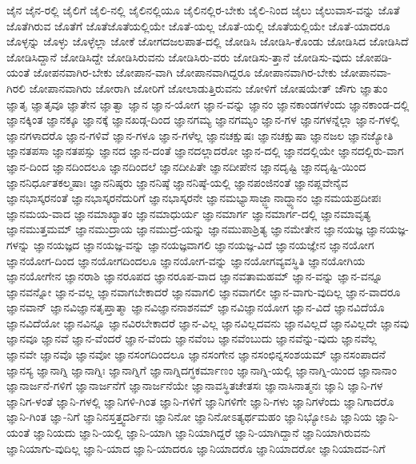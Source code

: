 {ಜೈನ
ಜೈನ-ರಲ್ಲಿ
ಜೈಲಿಗೆ
ಜೈಲಿ-ನಲ್ಲಿ
ಜೈಲಿನಲ್ಲಿಯೂ
ಜೈಲಿನಲ್ಲಿರ-ಬೇಕು
ಜೈಲಿ-ನಿಂದ
ಜೈಲು
ಜೈಲುವಾಸ-ವನ್ನು
ಜೊತೆ
ಜೊತೆಗಿರುವ
ಜೊತೆಗೆ
ಜೊತೆಜೊತೆಯಲ್ಲಿಯೇ
ಜೊತೆ-ಯಲ್ಲ
ಜೊತೆ-ಯಲ್ಲಿ
ಜೊತೆಯಲ್ಲಿಯೇ
ಜೊತೆ-ಯಾದರೂ
ಜೊಳ್ಳನ್ನು
ಜೊಳ್ಳು
ಜೊಳ್ಳೆಲ್ಲಾ
ಜೋಕೆ
ಜೋಗದಜಲಪಾತ-ದಲ್ಲಿ
ಜೋಡಿಸಿ
ಜೋಡಿಸಿ-ಕೊಂಡು
ಜೋಡಿಸಿದ
ಜೋಡಿಸಿದೆ
ಜೋಡಿಸಿದ್ದಾನೆ
ಜೋಡಿಸಿದ್ದೇ
ಜೋಡಿಸಿರುವನು
ಜೋಡಿಸಿರು-ವರು
ಜೋಡಿಸು-ತ್ತಾನೆ
ಜೋಡಿಸು-ವುದು
ಜೋಪಡಿ-ಯಂತೆ
ಜೋಪನವಾಗಿರ-ಬೇಕು
ಜೋಪಾನ-ವಾಗಿ
ಜೋಪಾನವಾಗಿದ್ದರೂ
ಜೋಪಾನವಾಗಿರ-ಬೇಕು
ಜೋಪಾನವಾ-ಗಿರಲಿ
ಜೋಪಾನವಾಗಿರು
ಜೋರಾಗಿ
ಜೋರಿಗೆ
ಜೋಲಾಡುತ್ತಿರುವನು
ಜೋಳಿಗೆ
ಜೋಷಯೇತ್
ಜೌಗು
ಜ್ಞಾತುಂ
ಜ್ಞಾತೃ
ಜ್ಞಾತೃವೂ
ಜ್ಞಾತೇನ
ಜ್ಞಾತ್ವಾ
ಜ್ಞಾನ
ಜ್ಞಾನ-ಯೋಗ
ಜ್ಞಾನ-ವನ್ನು
ಜ್ಞಾನಂ
ಜ್ಞಾನಕಾಂಡಗಳೆಂದು
ಜ್ಞಾನಕಾಂಡ-ದಲ್ಲಿ
ಜ್ಞಾನಕ್ಕಿಂತ
ಜ್ಞಾನಕ್ಕೂ
ಜ್ಞಾನಕ್ಕೆ
ಜ್ಞಾನಖಡ್ಗ-ದಿಂದ
ಜ್ಞಾನಗಮ್ಯ
ಜ್ಞಾನಗಮ್ಯಂ
ಜ್ಞಾನ-ಗಳ
ಜ್ಞಾನಗಳನ್ನೆಲ್ಲಾ
ಜ್ಞಾನ-ಗಳಲ್ಲಿ
ಜ್ಞಾನಗಳಾದರೊ
ಜ್ಞಾನ-ಗಳಿವೆ
ಜ್ಞಾನ-ಗಳೂ
ಜ್ಞಾನ-ಗಳೆಲ್ಲ
ಜ್ಞಾನಚಕ್ಷುಷಃ
ಜ್ಞಾನಚಕ್ಷುಷಾ
ಜ್ಞಾನಜಲ
ಜ್ಞಾನಜ್ಯೋತಿ
ಜ್ಞಾನತಪಸಾ
ಜ್ಞಾನತಪಸ್ಸು
ಜ್ಞಾನದ
ಜ್ಞಾನ-ದಂತೆ
ಜ್ಞಾನದಲ್ಲಾದರೋ
ಜ್ಞಾನ-ದಲ್ಲಿ
ಜ್ಞಾನದಲ್ಲಿಯೇ
ಜ್ಞಾನದಲ್ಲಿರು-ವಾಗ
ಜ್ಞಾನ-ದಿಂದ
ಜ್ಞಾನದಿಂದಲೂ
ಜ್ಞಾನದಿಂದಲೆ
ಜ್ಞಾನದೀಪಿತೇ
ಜ್ಞಾನದೀಪೇನ
ಜ್ಞಾನದೃಷ್ಟಿ
ಜ್ಞಾನದೃಷ್ಟಿ-ಯಿಂದ
ಜ್ಞಾನನಿರ್ಧೂತಕಲ್ಮಷಾಃ
ಜ್ಞಾನನಿಷ್ಠರು
ಜ್ಞಾನನಿಷ್ಠೆ
ಜ್ಞಾನನಿಷ್ಠೆ-ಯಲ್ಲಿ
ಜ್ಞಾನಪಂಜಿನಂತೆ
ಜ್ಞಾನಪ್ಲವೇನೈವ
ಜ್ಞಾನಭಾಸ್ಕರನಂತೆ
ಜ್ಞಾನಭಾಸ್ಕರನೆದುರಿಗೆ
ಜ್ಞಾನಭಾಸ್ಕರನೇ
ಜ್ಞಾನಮಭ್ಯಾಸಾಜ್ಜ್ಞಾನಾದ್ಧ್ಯಾನಂ
ಜ್ಞಾನಮಯಪ್ರದೀಪಃ
ಜ್ಞಾನಮಯ-ವಾದ
ಜ್ಞಾನಮಾಖ್ಯಾತಂ
ಜ್ಞಾನಮಾಧುರ್ಯ
ಜ್ಞಾನಮಾರ್ಗ
ಜ್ಞಾನಮಾರ್ಗ-ದಲ್ಲಿ
ಜ್ಞಾನಮಾವೃತ್ಯ
ಜ್ಞಾನಮುತ್ತಮಮ್
ಜ್ಞಾನಮುದ್ರಾಯ
ಜ್ಞಾನಮುದ್ರೆ-ಯನ್ನು
ಜ್ಞಾನಮುಪಾಶ್ರಿತ್ಯ
ಜ್ಞಾನಮೇತೇನ
ಜ್ಞಾನಯಜ್ಞ
ಜ್ಞಾನಯಜ್ಞ-ಗಳನ್ನು
ಜ್ಞಾನಯಜ್ಞದ
ಜ್ಞಾನಯಜ್ಞ-ವನ್ನು
ಜ್ಞಾನಯಜ್ಞವಾಗಲಿ
ಜ್ಞಾನಯಜ್ಞ-ವಿದೆ
ಜ್ಞಾನಯಜ್ಞೇನ
ಜ್ಞಾನಯೋಗ
ಜ್ಞಾನಯೋಗ-ದಿಂದ
ಜ್ಞಾನಯೋಗದಿಂದಲೂ
ಜ್ಞಾನಯೋಗ-ವನ್ನು
ಜ್ಞಾನಯೋಗವ್ಯವಸ್ಥಿತಿ
ಜ್ಞಾನಯೋಗಿಯ
ಜ್ಞಾನಯೋಗೇನ
ಜ್ಞಾನರಾಶಿ
ಜ್ಞಾನರೂಪದ
ಜ್ಞಾನರೂಪ-ವಾದ
ಜ್ಞಾನವತಾಮಹಮ್
ಜ್ಞಾನ-ವನ್ನು
ಜ್ಞಾನ-ವನ್ನೂ
ಜ್ಞಾನವನ್ನೋ
ಜ್ಞಾನ-ವಲ್ಲ
ಜ್ಞಾನವಾಗಬೇಕಾದರೆ
ಜ್ಞಾನವಾಗಲಿ
ಜ್ಞಾನವಾಗಲೀ
ಜ್ಞಾನ-ವಾಗು-ವುದಿಲ್ಲ
ಜ್ಞಾನ-ವಾದರೂ
ಜ್ಞಾನವಾನ್
ಜ್ಞಾನವಿಜ್ಞಾನತೃಪ್ತಾತ್ಮಾ
ಜ್ಞಾನವಿಜ್ಞಾನನಾಶನಮ್
ಜ್ಞಾನವಿಜ್ಞಾನಯೋಗ
ಜ್ಞಾನ-ವಿದೆ
ಜ್ಞಾನವಿದೆಯೊ
ಜ್ಞಾನವಿದೆಯೋ
ಜ್ಞಾನವಿನ್ನೂ
ಜ್ಞಾನವಿರಬೇಕಾದರೆ
ಜ್ಞಾನ-ವಿಲ್ಲ
ಜ್ಞಾನವಿಲ್ಲದವನು
ಜ್ಞಾನವಿಲ್ಲದೆ
ಜ್ಞಾನವಿಲ್ಲದೇ
ಜ್ಞಾನವು
ಜ್ಞಾನವೂ
ಜ್ಞಾನವೆ
ಜ್ಞಾನ-ವೆಂದರೆ
ಜ್ಞಾನ-ವೆಂದು
ಜ್ಞಾನವೆಂಬ
ಜ್ಞಾನವೆಂಬುದು
ಜ್ಞಾನವೆನ್ನು-ವುದು
ಜ್ಞಾನವೆಲ್ಲ
ಜ್ಞಾನವೇ
ಜ್ಞಾನವೊ
ಜ್ಞಾನವೋ
ಜ್ಞಾನಸಂಗದಿಂದಲೂ
ಜ್ಞಾನಸಂಗೇನ
ಜ್ಞಾನಸಂಛಿನ್ನಸಂಶಯಮ್
ಜ್ಞಾನಸಂಪಾದನೆ
ಜ್ಞಾನಸ್ಯ
ಜ್ಞಾನಾಗ್ನಿ
ಜ್ಞಾನಾಗ್ನಿಃ
ಜ್ಞಾನಾಗ್ನಿಗೆ
ಜ್ಞಾನಾಗ್ನಿದಗ್ಧಕರ್ಮಾಣಂ
ಜ್ಞಾನಾಗ್ನಿ-ಯಲ್ಲಿ
ಜ್ಞಾನಾಗ್ನಿ-ಯಿಂದ
ಜ್ಞಾನಾನಾಂ
ಜ್ಞಾನಾರ್ಜನೆ-ಗಳಿಗೆ
ಜ್ಞಾನಾರ್ಜನೆಗೆ
ಜ್ಞಾನಾರ್ಜನೆಯೇ
ಜ್ಞಾನಾವಸ್ಥಿತಚೇತಸಃ
ಜ್ಞಾನಾಸಿನಾತ್ಮನಃ
ಜ್ಞಾನಿ
ಜ್ಞಾನಿ-ಗಳ
ಜ್ಞಾನಿಗ-ಳಂತೆ
ಜ್ಞಾನಿ-ಗಳಲ್ಲಿ
ಜ್ಞಾನಿಗಳಿ-ಗಿಂತ
ಜ್ಞಾನಿ-ಗಳಿಗೆ
ಜ್ಞಾನಿಗಳಿಗೇ
ಜ್ಞಾನಿ-ಗಳು
ಜ್ಞಾನಿಗಳೆಂದು
ಜ್ಞಾನಿಗಾದರೊ
ಜ್ಞಾನಿ-ಗಿಂತ
ಜ್ಞಾ-ನಿಗೆ
ಜ್ಞಾನಿನಸ್ತತ್ತ್ವದರ್ಶಿನಃ
ಜ್ಞಾನಿನೋ
ಜ್ಞಾನಿನೋಽತ್ಯರ್ಥಮಹಂ
ಜ್ಞಾನಿಭ್ಯೋಽಪಿ
ಜ್ಞಾನಿಯ
ಜ್ಞಾನಿ-ಯಂತೆ
ಜ್ಞಾನಿಯದು
ಜ್ಞಾನಿ-ಯಲ್ಲಿ
ಜ್ಞಾನಿ-ಯಾಗಿ
ಜ್ಞಾನಿಯಾಗಿದ್ದರೆ
ಜ್ಞಾನಿ-ಯಾಗಿದ್ದಾನೆ
ಜ್ಞಾನಿಯಾಗಿರುವನು
ಜ್ಞಾನಿಯಾಗು-ವುದಿಲ್ಲ
ಜ್ಞಾನಿ-ಯಾದ
ಜ್ಞಾನಿ-ಯಾದರೂ
ಜ್ಞಾನಿಯಾದರೊ
ಜ್ಞಾನಿಯಾದರೋ
ಜ್ಞಾನಿಯಾದವ-ನಿಗೆ
}
